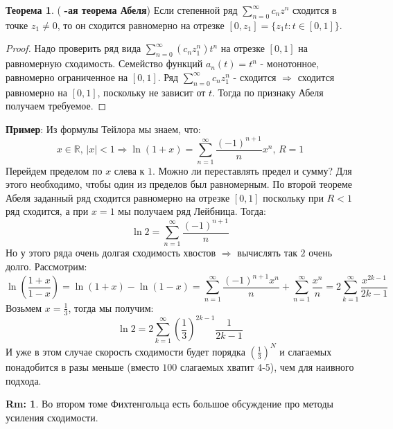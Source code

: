 \documentclass[12pt]{article}
\newcommand{\RN}[1]{%
	\textup{\uppercase\expandafter{\romannumeral#1}}%
}
\newcommand{\MR}{\mathbb{R}}
\theoremstyle{definition}
\newtheorem{rem}{Rm:}
\newtheorem{theorem}{Теорема}
\newcommand{\ddsum}[2]{\displaystyle\sum\limits_{#1}^{#2}}
\begin{document}
\begin{theorem}(\textbf{\RN{2}-ая теорема Абеля})
	Если степенной ряд $\ddsum{n = 0}{\infty}c_n z^n$ сходится в точке $z_1 \neq 0$, то он сходится равномерно на отрезке $[0,z_1] = \{z_1t\colon t \in [0,1]\}$.
\end{theorem}
\begin{proof}
	Надо проверить ряд вида $\ddsum{n = 0}{\infty}(c_n z_1^n)t^n$ на отрезке $[0,1]$ на равномерную сходимость. Семейство функций $a_n(t) = t^n$ - монотонное, равномерно ограниченное на $[0,1]$. Ряд $\ddsum{n = 0}{\infty}c_n z_1^n$ - сходится $\Rightarrow$ сходится равномерно на $[0,1]$, поскольку не зависит от $t$. Тогда по признаку Абеля получаем требуемое.
\end{proof}

\textbf{Пример}: Из формулы Тейлора мы знаем, что:
$$
	x \in \MR, \, |x| < 1 \Rightarrow \ln(1 + x)  = \ddsum{n = 1}{\infty}\dfrac{(-1)^{n+1}}{n}x^n, \, R = 1
$$
Перейдем пределом по $x$ слева к $1$. Можно ли переставлять предел и сумму? Для этого необходимо, чтобы один из пределов был равномерным. По второй теореме Абеля заданный ряд сходится равномерно на отрезке $[0,1]$ поскольку при $R <1$ ряд сходится, а при $x = 1$ мы получаем ряд Лейбница. Тогда:
$$
	\ln{2} = \ddsum{n = 1}{\infty}\dfrac{(-1)^{n+1}}{n}
$$
Но у этого ряда очень долгая сходимость хвостов $\Rightarrow$ вычислять так $2$ очень долго. Рассмотрим:
$$
	\ln{\left(\dfrac{1+x}{1-x}\right)} = \ln{(1 + x)} - \ln{(1-x)} = \ddsum{n = 1}{\infty}\dfrac{(-1)^{n+1}x^n}{n} + \ddsum{n = 1}{\infty}\dfrac{x^n}{n} = 2\ddsum{k = 1}{\infty}\dfrac{x^{2k - 1}}{2k - 1}
$$
Возьмем $x = \tfrac{1}{3}$, тогда мы получим:
$$
	\ln{2} = 2 \ddsum{k = 1}{\infty}\left(\dfrac{1}{3}\right)^{2k - 1}\dfrac{1}{2k-1}
$$
И уже в этом случае скорость сходимости будет порядка $\left(\tfrac{1}{3}\right)^N$ и слагаемых понадобится в разы меньше (вместо $100$ слагаемых хватит  $4$-$5$), чем для наивного подхода.

\begin{rem}
	Во втором томе Фихтенгольца есть большое обсуждение про методы усиления сходимости.
\end{rem}
\end{document}
